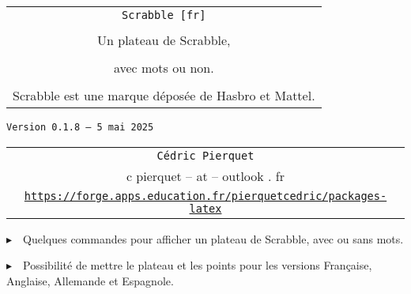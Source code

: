 \documentclass{article}
\def\TPversion{0.1.8}
\def\TPdate{5 mai 2025}
\begin{document}
\pagestyle{fancy}

\thispagestyle{empty}

\vspace{2cm}

\begin{center}
	\begin{minipage}{0.75\linewidth}
	\begin{tcolorbox}[colframe=yellow,colback=yellow!15]
		\begin{center}
			\begin{tabular}{c}
				{\Huge \texttt{Scrabble [fr]}}\\
				\\
				{\LARGE Un plateau de Scrabble,} \\
				\\
				{\LARGE avec mots ou non.} \\
				\\
				{Scrabble\texttrademark{} est une marque déposée de Hasbro\texttrademark{} et Mattel\texttrademark{}.}
			\end{tabular}
			
			\medskip
			
			{\small \texttt{Version \TPversion{} -- \TPdate}}
		\end{center}
	\end{tcolorbox}
\end{minipage}
\end{center}

\vspace{0.5cm}

\begin{center}
	\begin{tabular}{c}
	\texttt{Cédric Pierquet}\\
	{\ttfamily c pierquet -- at -- outlook . fr}\\
	\texttt{\url{https://forge.apps.education.fr/pierquetcedric/packages-latex}}
\end{tabular}
\end{center}

\vspace{0.5cm}

{$\blacktriangleright$~~Quelques commandes pour afficher un plateau de Scrabble, avec ou sans mots.}

\smallskip

{$\blacktriangleright$~~Possibilité de mettre le plateau et les points pour les versions Française, Anglaise, Allemande et Espagnole.}

\smallskip
\end{document}
